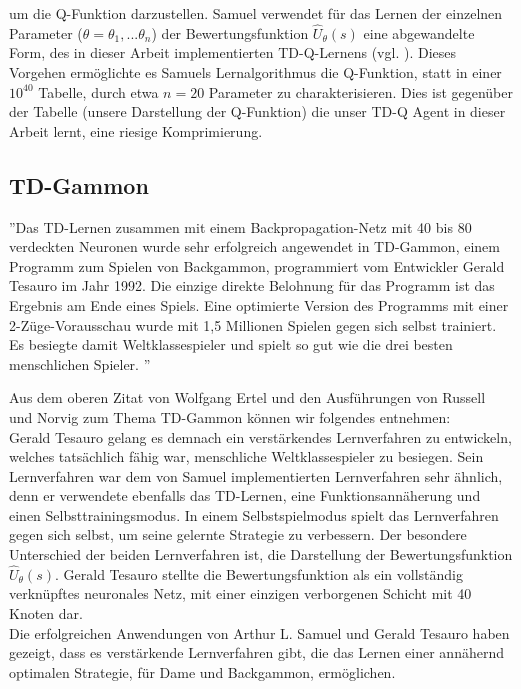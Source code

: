 um die Q-Funktion darzustellen. Samuel verwendet für das Lernen der einzelnen Parameter ($\theta = \theta_1, ... \theta_n$) der Bewertungsfunktion $\hat{U}_\theta(s)$ eine abgewandelte Form, des in dieser Arbeit implementierten TD-Q-Lernens (vgl. \cite[981]{Russell}). Dieses Vorgehen ermöglichte es Samuels Lernalgorithmus die Q-Funktion, statt in einer $10^{40}$ Tabelle, durch etwa $n = 20$ Parameter zu charakterisieren. Dies ist gegenüber der Tabelle (unsere Darstellung der Q-Funktion) die unser TD-Q Agent in dieser Arbeit lernt, eine riesige Komprimierung. \\

\subsection{TD-Gammon}
\label{subsec:TD-Gammon}
''Das TD-Lernen zusammen mit einem Backpropagation-Netz mit 40 bis 80 verdeckten Neuronen wurde sehr erfolgreich angewendet in TD-Gammon, einem Programm zum Spielen von Backgammon, programmiert vom Entwickler Gerald Tesauro im Jahr 1992. Die einzige direkte Belohnung für das Programm ist das Ergebnis am Ende eines Spiels. Eine optimierte Version des Programms mit einer 2-Züge-Vorausschau wurde mit 1,5 Millionen Spielen gegen sich selbst trainiert. Es besiegte damit Weltklassespieler und spielt so gut wie die drei besten menschlichen Spieler. \cite[304]{Ertel}''

Aus dem oberen Zitat von Wolfgang Ertel und den Ausführungen von Russell und Norvig \cite[982]{Russell} zum Thema TD-Gammon können wir folgendes entnehmen: \\

Gerald Tesauro gelang es demnach ein verstärkendes Lernverfahren zu entwickeln, welches tatsächlich fähig war, menschliche Weltklassespieler zu besiegen. Sein Lernverfahren war dem von Samuel implementierten Lernverfahren sehr ähnlich, denn er verwendete ebenfalls das TD-Lernen, eine Funktionsannäherung und einen Selbsttrainingsmodus. In einem Selbstspielmodus spielt das Lernverfahren gegen sich selbst, um seine gelernte Strategie zu verbessern. Der besondere Unterschied der beiden Lernverfahren ist, die Darstellung der Bewertungsfunktion $\hat{U}_\theta(s)$. Gerald Tesauro stellte die Bewertungsfunktion als ein vollständig verknüpftes neuronales Netz, mit einer einzigen verborgenen Schicht mit 40 Knoten dar. \\

Die erfolgreichen Anwendungen von Arthur L. Samuel und Gerald Tesauro haben gezeigt, dass es verstärkende Lernverfahren gibt, die das Lernen einer annähernd optimalen Strategie, für Dame und Backgammon, ermöglichen. \\